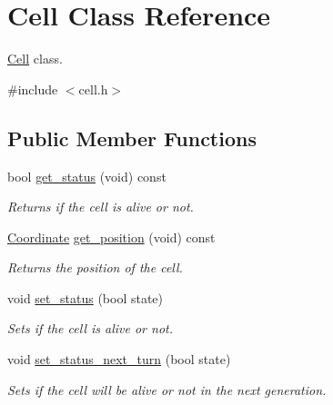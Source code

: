 \hypertarget{classCell}{}\section{Cell Class Reference}
\label{classCell}


\hyperlink{classCell}{Cell} class.  




{\ttfamily \#include $<$cell.\+h$>$}

\subsection*{Public Member Functions}
\begin{DoxyCompactItemize}
\item 
\mbox{\label{classCell_a95e4a2abde4efb9e6cbd98eae40b3c8c}} 
bool \hyperlink{classCell_a95e4a2abde4efb9e6cbd98eae40b3c8c}{get\+\_\+status} (void) const
\begin{DoxyCompactList}\small\item\em Returns if the cell is alive or not. \end{DoxyCompactList}\item 
\mbox{\label{classCell_addef4c9211ab57aeb9d3131265b80825}} 
\hyperlink{classCoordinate}{Coordinate} \hyperlink{classCell_addef4c9211ab57aeb9d3131265b80825}{get\+\_\+position} (void) const
\begin{DoxyCompactList}\small\item\em Returns the position of the cell. \end{DoxyCompactList}\item 
\mbox{\label{classCell_aafff1939e38ac31db5e933995cc2d6ce}} 
void \hyperlink{classCell_aafff1939e38ac31db5e933995cc2d6ce}{set\+\_\+status} (bool state)
\begin{DoxyCompactList}\small\item\em Sets if the cell is alive or not. \end{DoxyCompactList}\item 
\mbox{\label{classCell_a317e14da6774f4bcafbe8de8590af0a7}} 
void \hyperlink{classCell_a317e14da6774f4bcafbe8de8590af0a7}{set\+\_\+status\+\_\+next\+\_\+turn} (bool state)
\begin{DoxyCompactList}\small\item\em Sets if the cell will be alive or not in the next generation. \end{DoxyCompactList}\item 

\end{DoxyCompactItemize}
